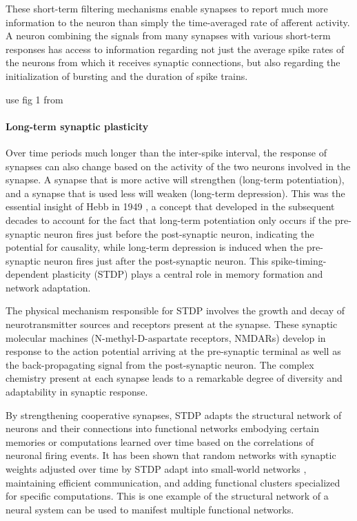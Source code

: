 \documentclass[twocolumn]{article}
\begin{document}
These short-term filtering mechanisms enable synapses to report much more information to the neuron than simply the time-averaged rate of afferent activity. A neuron combining the signals from many synapses with various short-term responses has access to information regarding not just the average spike rates of the neurons from which it receives synaptic connections, but also regarding the initialization of bursting and the duration of spike trains.

\vspace{3em}
use fig 1 from \cite{izde2003}

\paragraph{Long-term synaptic plasticity}
Over time periods much longer than the inter-spike interval, the response of synapses can also change based on the activity of the two neurons involved in the synapse. A synapse that is more active will strengthen (long-term potentiation), and a synapse that is used less will weaken (long-term depression). This was the essential insight of Hebb in 1949 \cite{he1949}, a concept that developed in the subsequent decades \cite{bipo1998,somi2000} to account for the fact that long-term potentiation only occurs if the pre-synaptic neuron fires just before the post-synaptic neuron, indicating the potential for causality, while long-term depression is induced when the pre-synaptic neuron fires just after the post-synaptic neuron. This spike-timing-dependent plasticity (STDP) \cite{mage2012} plays a central role in memory formation and network adaptation. 

The physical mechanism responsible for STDP involves the growth and decay of neurotransmitter sources and receptors present at the synapse. These synaptic molecular machines (N-methyl-D-aspartate receptors, NMDARs) develop in response to the action potential arriving at the pre-synaptic terminal as well as the back-propagating signal from the post-synaptic neuron. The complex chemistry present at each synapse leads to a remarkable degree of diversity and adaptability in synaptic response.

By strengthening cooperative synapses, STDP adapts the structural network of neurons and their connections into functional networks embodying certain memories or computations learned over time based on the correlations of neuronal firing events. It has been shown that random networks with synaptic weights adjusted over time by STDP adapt into small-world networks \cite{shki2006}, maintaining efficient communication, and adding functional clusters specialized for specific computations. This is one example of the structural network of a neural system can be used to manifest multiple functional networks.
\end{document}
